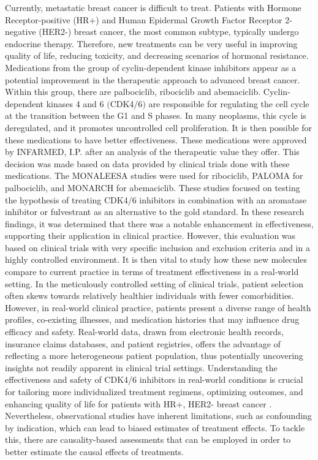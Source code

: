 Currently, metastatic breast cancer is difficult to treat. Patients with Hormone Receptor-positive (HR+) and Human Epidermal Growth Factor Receptor 2-negative (HER2-) breast cancer, the most common subtype, typically undergo endocrine therapy. Therefore, new treatments can be very useful in improving quality of life, reducing toxicity, and decreasing scenarios of hormonal resistance.
Medications from the group of cyclin-dependent kinase inhibitors appear as a potential improvement in the therapeutic approach to advanced breast cancer. Within this group, there are palbociclib, ribociclib and abemaciclib. Cyclin-dependent kinases 4 and 6 $($CDK4/6$)$ are responsible for regulating the cell cycle at the transition between the G1 and S phases. In many neoplasms, this cycle is deregulated, and it promotes uncontrolled cell proliferation. It is then possible for these medications to have better effectiveness. These medications were approved by INFARMED, I.P. after an analysis of the therapeutic value they offer. This decision was made based on data provided by clinical trials done with these medications. The MONALEESA \cite{hortobagyiUpdatedResultsMONALEESA22018, slamonPhaseIIIRandomized2018, tripathyRibociclibEndocrineTherapy2018} studies were used for ribociclib, PALOMA \cite{vermaPalbociclibCombinationFulvestrant2016, rugoImpactPalbociclibLetrozole2018, finnCyclindependentKinaseInhibitor2015a} for palbociclib, and MONARCH \cite{goetzMONARCHAbemaciclibInitial2017, sledgeMONARCHAbemaciclibCombination2017} for abemaciclib.
These studies focused on testing the hypothesis of treating CDK4/6 inhibitors in combination with an aromatase inhibitor or fulvestrant as an alternative to the gold standard. In these research findings, it was determined that there was a notable enhancement in effectiveness, supporting their application in clinical practice.
However, this evaluation was based on clinical trials with very specific inclusion and exclusion criteria and in a highly controlled environment. It is then vital to study how these new molecules compare to current practice in terms of treatment effectiveness in a real-world setting. In the meticulously controlled setting of clinical trials, patient selection often skews towards relatively healthier individuals with fewer comorbidities. However, in real-world clinical practice, patients present a diverse range of health profiles, co-existing illnesses, and medication histories that may influence drug efficacy and safety. Real-world data, drawn from electronic health records, insurance claims databases, and patient registries, offers the advantage of reflecting a more heterogeneous patient population, thus potentially uncovering insights not readily apparent in clinical trial settings. Understanding the effectiveness and safety of CDK4/6 inhibitors in real-world conditions is crucial for tailoring more individualized treatment regimens, optimizing outcomes, and enhancing quality of life for patients with HR+, HER2- breast cancer \cite{harbeckCDK4InhibitorsHR2021}. Nevertheless, observational studies have inherent limitations, such as confounding by indication, which can lead to biased estimates of treatment effects. To tackle this, there are causality-based assessments that can be employed in order to better estimate the causal effects of treatments.
